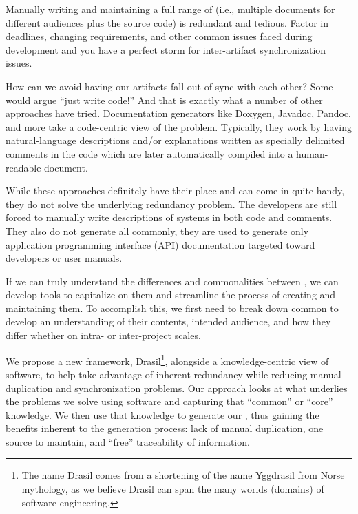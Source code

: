 Manually writing and maintaining a full range of \sfs{} (i.e.,
multiple documents for different audiences plus the source code) is
redundant and tedious. Factor in deadlines, changing requirements, and other
common issues faced during development and you have a perfect storm for
inter-artifact synchronization issues.

How can we avoid having our artifacts fall out of sync with each other?
Some would argue ``just write code!'' And that is exactly what a number of other
approaches have tried. Documentation generators like Doxygen, Javadoc, Pandoc,
and more take a code-centric view of the problem. Typically, they work by having
natural-language descriptions and/or explanations written as specially delimited
comments in the code which are later automatically compiled into a
human-readable document.

While these approaches definitely have their place and can come in quite handy,
they do not solve the underlying redundancy problem. The developers are still
forced to manually write descriptions of systems in both code and comments.
They also do not generate all \sfs{}\textemdash{}commonly, they are used to
generate only application programming interface (API) documentation targeted
toward developers or user manuals.

If we can truly understand the differences and commonalities between 
\sfs{}, we can develop tools to capitalize on them and streamline 
the process of creating and maintaining them. To accomplish this, we first 
need to break down common \sfs{} to develop an understanding of their 
contents, intended audience, and how they differ whether on intra- or 
inter-project scales.

We propose a new framework, Drasil\footnote{The name Drasil comes from a 
shortening of the name Yggdrasil from Norse mythology, as we believe Drasil can 
span the many worlds (domains) of software engineering.}, alongside a 
knowledge-centric view of software, to help take advantage of inherent 
redundancy while reducing manual duplication and synchronization problems. Our 
approach looks at what underlies the problems we solve using software and 
capturing that ``common'' or ``core'' knowledge. We then use that knowledge to
generate our \sfs{}, thus gaining the benefits inherent to the generation 
process: lack of manual 
duplication, one source to maintain, and ``free'' traceability of information.

